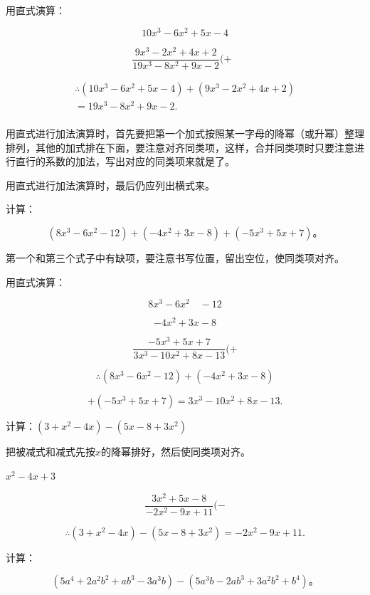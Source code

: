  用直式演算：

\[
10 x ^{3} - 6 x ^{2} + 5 x - 4
\]

\[
\frac{9 x ^{3} - 2 x ^{2} + 4 x + 2}{19 x ^{3} - 8 x ^{2} + 9 x - 2} (+ \text{ }
\]

\[
\begin{array}{l} \therefore (10 x ^{3} - 6 x ^{2} + 5 x - 4) + (9 x ^{3} - 2 x ^{2} + 4 x + 2) \\ = 19 x ^{3} - 8 x ^{2} + 9 x - 2. \\ \end{array}
\]

用直式进行加法演算时，首先要把第一个加式按照某一字母的降幂（或升幂）整理排列，其他的加式排在下面，要注意对齐同类项，这样，合并同类项时只要注意进行直行的系数的加法，写出对应的同类项来就是了。

用直式进行加法演算时，最后仍应列出横式来。

 计算：

\[
(8 x ^{3} - 6 x ^{2} - 12) + (- 4 x ^{2} + 3 x - 8) + (- 5 x ^{3} + 5 x + 7)\text{。}
\]

第一个和第三个式子中有缺项，要注意书写位置，留出空位，使同类项对齐。

 用直式演算：

\[
8 x ^{3} - 6 x ^{2} \quad - 12
\]

\[
- 4 x ^{2} + 3 x - 8
\]

\[
\frac{- 5 x ^{3} + 5 x + 7}{3 x ^{3} - 10 x ^{2} + 8 x - 13} (+
\]

\[
\therefore (8 x ^{3} - 6 x ^{2} - 12) + (- 4 x ^{2} + 3 x - 8)
\]

\[
+ (- 5 x ^{3} + 5 x + 7) = 3 x ^{3} - 10 x ^{2} + 8 x - 13.
\]

 计算：\((3+x^{2}-4x)-(5x-8+3x^{2})\)

 把被减式和减式先按\(x\)的降幂排好，然后使同类项对齐。

\(x^{2} - 4x + 3\)

\[
\frac{3 x ^{2} + 5 x - 8}{- 2 x ^{2} - 9 x + 11} (-
\]

\[
\therefore (3 + x ^{2} - 4 x) - (5 x - 8 + 3 x ^{2}) = - 2 x ^{2} - 9 x + 11.
\]

 计算：

\[
(5 a ^{4} + 2 a ^{2} b ^{2} + a b ^{3} - 3 a ^{3} b) - (5 a ^{3} b - 2 a b ^{3} + 3 a ^{2} b ^{2} + b ^{4})\text{。}
\]

